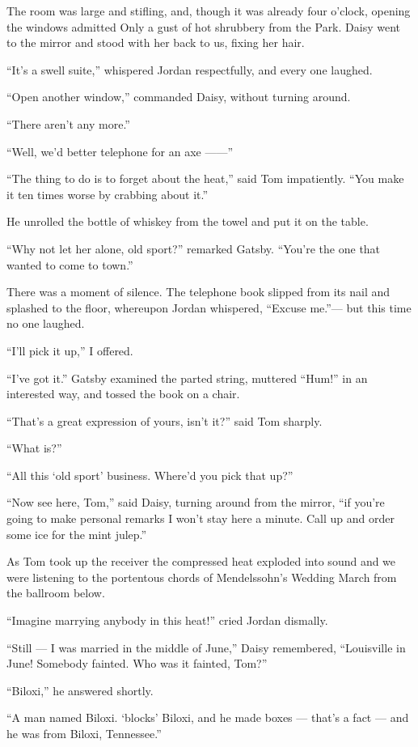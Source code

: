 \documentclass{znotebook}
\begin{document}
The room was large and stifling, and, though it was already four o’clock, opening the windows admitted Only a gust of hot shrubbery from the Park. Daisy went to the mirror and stood with her back to us, fixing her hair.

``It’s a swell suite,'' whispered Jordan respectfully, and every one laughed.

``Open another window,'' commanded Daisy, without turning around.

``There aren’t any more.''

``Well, we’d better telephone for an axe ——''

``The thing to do is to forget about the heat,'' said Tom impatiently. ``You make it ten times worse by crabbing about it.''

He unrolled the bottle of whiskey from the towel and put it on the table.

``Why not let her alone, old sport?'' remarked Gatsby. ``You’re the one that wanted to come to town.''

There was a moment of silence. The telephone book slipped from its nail and splashed to the floor, whereupon Jordan whispered, ``Excuse me.''— but this time no one laughed.

``I’ll pick it up,'' I offered.

``I’ve got it.'' Gatsby examined the parted string, muttered ``Hum!'' in an interested way, and tossed the book on a chair.

``That’s a great expression of yours, isn’t it?'' said Tom sharply.

``What is?''

``All this ‘old sport’ business. Where’d you pick that up?''

``Now see here, Tom,'' said Daisy, turning around from the mirror, ``if you’re going to make personal remarks I won’t stay here a minute. Call up and order some ice for the mint julep.''

As Tom took up the receiver the compressed heat exploded into sound and we were listening to the portentous chords of Mendelssohn’s Wedding March from the ballroom below.

``Imagine marrying anybody in this heat!'' cried Jordan dismally.

``Still — I was married in the middle of June,'' Daisy remembered, ``Louisville in June! Somebody fainted. Who was it fainted, Tom?''

``Biloxi,'' he answered shortly.

``A man named Biloxi. ‘blocks’ Biloxi, and he made boxes — that’s a fact — and he was from Biloxi, Tennessee.''
\end{document}
